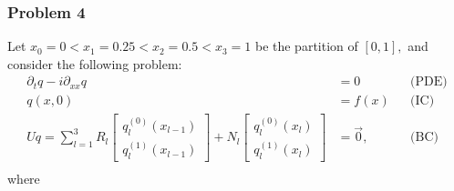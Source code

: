 \documentclass[11pt,reqno,oneside,a4paper]{article}
\theoremstyle{plain} %
\theoremstyle{definition}
\theoremstyle{remark}
\begin{document}
\subsubsection*{Problem 4}
Let $x_0 = 0 < x_1  = 0.25 < x_2 = 0.5 < x_3 = 1$ be the partition of $[0,1],$ and consider the following problem:
\begin{align*}
\partial_t q - i \partial_{xx} q &= 0 &&\text{(PDE)} \\
q(x, 0) &= f(x) &&\text{(IC)} \\
Uq = \sum^3_{l=1} R_l \begin{bmatrix} q_l^{(0)}(x_{l-1}) \\ q_l^{(1)}(x_{l-1}) \end{bmatrix} + N_l \begin{bmatrix} q_l^{(0)}(x_{l}) \\ q_l^{(1)}(x_{l}) \end{bmatrix} &= \vec{0}, &&\text{(BC)} \\
\end{align*}
where 
\end{document}
